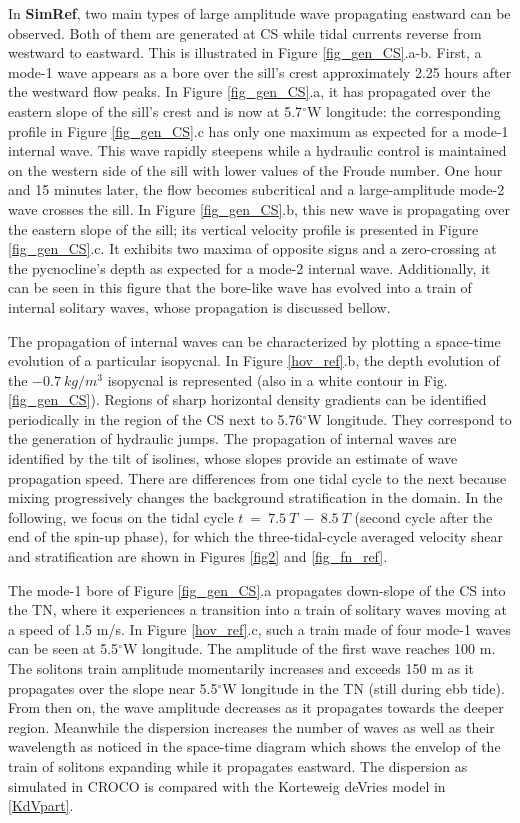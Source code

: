 In \textbf{SimRef}, two main types of large amplitude wave propagating eastward can be observed. Both of them are generated at CS while tidal currents reverse from westward to eastward. This is illustrated in Figure \ref{fig_gen_CS}.a-b. First, a mode-1 wave appears as a bore over the sill's crest approximately 2.25 hours after the westward flow peaks. 
In Figure \ref{fig_gen_CS}.a, it has propagated over the eastern slope of the sill's crest and is now at 5.7$^\circ$W longitude: the corresponding profile in Figure \ref{fig_gen_CS}.c has only one maximum as expected for a mode-1 internal wave. This wave rapidly steepens while a hydraulic control is maintained on the western side of the sill with lower values of the Froude number. One hour and 15 minutes later, the flow becomes subcritical and a large-amplitude mode-2 wave crosses the sill. 
In Figure \ref{fig_gen_CS}.b, this new wave is propagating over the eastern slope of the sill; its vertical velocity profile is presented in Figure \ref{fig_gen_CS}.c. It exhibits two maxima of opposite signs and a zero-crossing at the pycnocline's depth as expected for a mode-2 internal wave. Additionally, it can be seen in this figure that the bore-like wave has evolved into a train of internal solitary waves, whose propagation is discussed bellow. 

The propagation of internal waves can be characterized by plotting a space-time evolution of a particular isopycnal. In Figure \ref{hov_ref}.b, the depth evolution of the $-0.7\  kg/m^3$ isopycnal is represented (also in a white contour in Fig. \ref{fig_gen_CS}). Regions of sharp horizontal density gradients can be identified periodically in the region of the CS next to 5.76$^\circ$W longitude. They correspond to the generation of hydraulic jumps. The propagation of internal waves are identified by the tilt of isolines, whose slopes provide an estimate of wave propagation speed. There are differences from one tidal cycle to the next because mixing progressively changes the background stratification in the domain. In the following, we focus on the tidal cycle $t\ =\ 7.5\ T\ -\ 8.5\ T$ (second cycle after the end of the spin-up phase), for which the three-tidal-cycle averaged velocity shear and stratification are shown in Figures \ref{fig2} and \ref{fig_fn_ref}.

The mode-1 bore of Figure \ref{fig_gen_CS}.a propagates down-slope of the CS into the TN, where it experiences a transition into a train of solitary waves moving at a speed of 1.5 m/s. In Figure \ref{hov_ref}.c, such a train made of four mode-1 waves can be seen at 5.5$^\circ$W longitude. The amplitude of the first wave reaches 100 m. The solitons train amplitude momentarily increases and exceeds 150 m as it propagates over the slope near 5.5$^\circ$W longitude in the TN (still during ebb tide). From then on, the wave amplitude decreases as it propagates towards the deeper region. Meanwhile the dispersion increases the number of waves as well as their wavelength as noticed in the space-time diagram which shows the envelop of the train of solitons expanding while it propagates eastward. The dispersion as simulated in CROCO is compared with the Korteweig deVries model in \ref{KdVpart}.

